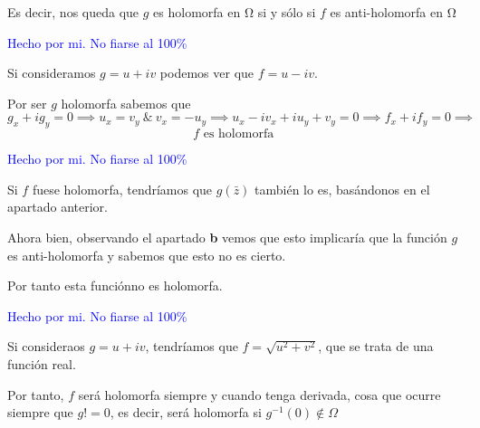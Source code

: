 \begin{problem}[7]
Es decir, nos queda que $g$ es holomorfa en Ω si y sólo si $f$ es anti-holomorfa en Ω

\spart
\textcolor{blue}{Hecho por mi. No fiarse al 100\%}

Si consideramos $g=u+iv$ podemos ver que $f=u-iv$.

Por ser $g$ holomorfa sabemos que
\[g_x+ig_y = 0 \implies u_x=v_y \ \& \ v_x=-u_y \implies u_x-iv_x+iu_y+v_y = 0 \implies f_x+if_y=0 \implies\]
\[f \text{ es holomorfa }\]


\spart
\textcolor{blue}{Hecho por mi. No fiarse al 100\%}

Si $f$ fuese holomorfa, tendríamos que $g(\bar{z})$ también lo es, basándonos en el apartado anterior.

Ahora bien, observando el apartado \textbf{b} vemos que esto implicaría que la función $g$ es anti-holomorfa y sabemos que esto no es cierto.

Por tanto esta funciónno es holomorfa.

\spart
\textcolor{blue}{Hecho por mi. No fiarse al 100\%}

Si consideraos $g=u+iv$, tendríamos que $f=\sqrt{u^2+v^2}$, que se trata de una función real.

Por tanto, $f$ será holomorfa siempre y cuando tenga derivada, cosa que ocurre siempre que $g!=0$, es decir, será holomorfa si $g^{-1}(0) \notin Ω$

\end{problem}


